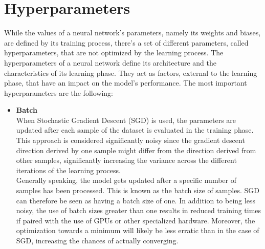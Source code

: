 \section{Hyperparameters} \label{hyperdescrp}
While the values of a neural network’s parameters, namely its weights and biases, are defined by its training process, there’s a set of different parameters, called hyperparameters, that are not optimized by the learning process. 
The hyperparameters of a neural network define its architecture and the characteristics of its learning phase. They act as factors, external to the learning phase, that have an impact on the model’s performance.
The most important hyperparameters are the following:
\begin{itemize}
    \item \textbf{Batch}
    \\When Stochastic Gradient Descent (SGD) is used, the parameters are updated after each sample of the dataset is evaluated in the training phase. This approach is considered significantly noisy since the gradient descent direction derived by one sample might differ from the direction derived from other samples, significantly increasing the variance across the different iterations of the learning process.
    \\Generally speaking, the model gets updated after a specific number of samples has been processed. This is known as the batch size of samples.  SGD can therefore be seen as having a batch size of one.
    In addition to being less noisy, the use of batch sizes greater than one results in reduced training times if paired with the use of GPUs or other specialized hardware. Moreover, the optimization towards a minimum will likely be less erratic than in the case of SGD, increasing the chances of actually converging.


\end{itemize}
